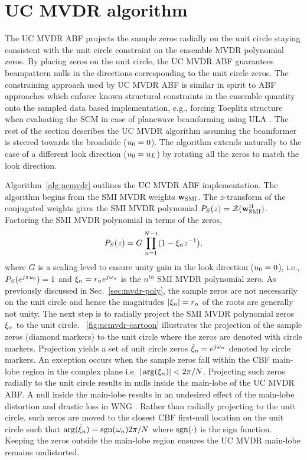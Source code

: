\section{UC MVDR algorithm}
\label{sec:ucmvdr-algorithm}
The UC MVDR ABF projects the sample zeros radially on the
unit circle staying consistent with the unit circle constraint on the
ensemble MVDR polynomial zeros. By placing zeros on the unit circle,
the UC MVDR ABF guarantees beampattern nulls in the directions
corresponding to the unit circle zeros. The constraining approach used
by UC MVDR ABF is similar in spirit to ABF approaches which enforce
known structural constraints in the ensemble quantity onto the sampled
data based implementation, e.g., forcing Toeplitz structure when
evaluating the SCM in case of planewave beamforming using ULA
\cite{fuhrmann1991toeplitz}. The rest of the section describes the UC
MVDR algorithm assuming the beamformer is steered towards the
broadside ($u_0 = 0$). The algorithm extends naturally to the case
of a different look direction ($u_0 = u_L$) by rotating all the
zeros to match the look direction.

Algorithm~\ref{alg:ucmvdr} outlines the UC MVDR ABF
implementation. The algorithm begins from the SMI MVDR weights
${\bf w}_{\rm SMI}$. The $z$-transform of the conjugated weights gives the SMI
MVDR polynomial $P_S(z) = \mathcal{Z}{({\bf w}_{\rm SMI}^{\rm H})}$. Factoring the SMI
MVDR polynomial in terms of the zeros,
\[
P_S(z) = G \prod\limits_{n=1}^{N-1}(1 - \xi_n z^{-1}),  
\]
where $G$ is a scaling level to ensure unity gain in the look
direction ($u_0 = 0$), i.e., $P_S(e^{j\pi u_0}) = 1$ and $\xi_n = r_ne^{j\omega_n}$ is the $n^{th}$ SMI MVDR
polynomial zero. As previously discussed in Sec.~\ref{sec:mvdr-poly},
the sample zeros are not necessarily on the unit circle
and hence the magnitudes $|\xi_n| = r_n$ of the roots are generally
not unity. The next step is to radially project the SMI MVDR
polynomial zeros $\xi_n$ to the unit circle. \figurename{}~\ref{fig:ucmvdr-cartoon} illustrates the projection of the sample zeros (diamond markers) to the unit circle where the zeros are denoted with circle markers. Projection yields a
set of unit circle zeros $\hat{\xi}_n = e^{j\omega_n}$ denoted by circle
markers. An exception occurs when the sample zeros fall within the CBF
main-lobe region in the complex plane
i.e. $|\operatorname{arg}(\xi_n)|<2\pi/N$. Projecting such
zeros radially to the unit circle results in nulls inside the
main-lobe of the UC MVDR ABF. A null inside the main-lobe results in
an undesired effect of the main-lobe distortion and drastic loss in
WNG \cite[Sec.~6.3.1]{vtree2002oap}. Rather than radially projecting
to the unit circle, such zeros are moved to the closest CBF
first-null location on the unit circle such that
$\operatorname{arg}(\hat{\xi}_n) = {\operatorname{sgn}}(\omega_n){2\pi/N}$ where
${\operatorname{sgn}}(\cdot)$ is the sign function. Keeping the zeros outside the
main-lobe region ensures the UC MVDR main-lobe remains undistorted.

